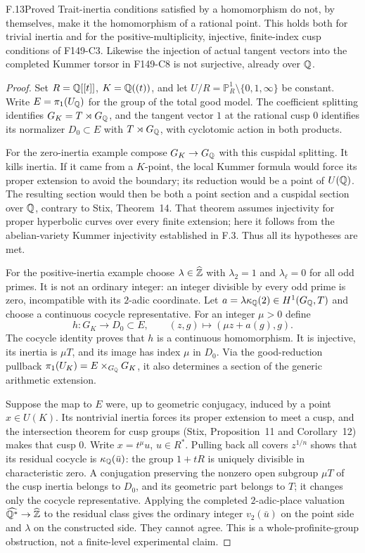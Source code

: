 \begin{claim}{F.13}{Proved}
Trait-inertia conditions satisfied by a homomorphism do not, by
themselves, make it the homomorphism of a rational point. This holds
both for trivial inertia and for the positive-multiplicity, injective,
finite-index cusp conditions of F149-C3. Likewise the injection of
actual tangent vectors into the completed Kummer torsor in F149-C8
is not surjective, already over $\mathbb Q$.
\end{claim}
\begin{proof}
Set $R=\mathbb Q[[t]]$, $K=\mathbb Q((t))$, and let
$U/R=\mathbb P^1_R\setminus\{0,1,\infty\}$ be constant. Write
$E=\pi_1(U_{\mathbb Q})$ for the group of the total good model. The
coefficient splitting identifies
$G_K=T\rtimes G_{\mathbb Q}$, and the tangent vector $1$ at the rational
cusp $0$ identifies its normalizer $D_0\subset E$ with
$T\rtimes G_{\mathbb Q}$, with cyclotomic action in both products.

For the zero-inertia example compose $G_K\to G_{\mathbb Q}$ with this
cuspidal splitting. It kills inertia. If it came from a $K$-point,
the local Kummer formula would force its proper extension to avoid
the boundary; its reduction would be a point of $U(\mathbb Q)$. The
resulting section would then be both a point section and a cuspidal
section over $\mathbb Q$, contrary to Stix, Theorem~14. That theorem
assumes injectivity for proper hyperbolic curves over every finite
extension; here it follows from the abelian-variety Kummer
injectivity established in F.3. Thus all its hypotheses are met.

For the positive-inertia example choose
$\lambda\in\widehat{\mathbb Z}$ with $\lambda_2=1$ and
$\lambda_\ell=0$ for all odd primes. It is not an ordinary integer:
an integer divisible by every odd prime is zero, incompatible with
its $2$-adic coordinate. Let
$a=\lambda\kappa_{\mathbb Q}(2)\in H^1(G_{\mathbb Q},T)$ and choose a
continuous cocycle representative. For an integer $\mu>0$ define
\[
h:G_K\longrightarrow D_0\subset E,
\qquad (z,g)\longmapsto(\mu z+a(g),g).
\]
The cocycle identity proves that $h$ is a continuous homomorphism.
It is injective, its inertia is $\mu T$, and its image has index
$\mu$ in $D_0$. Via the good-reduction pullback
$\pi_1(U_K)=E\times_{G_{\mathbb Q}}G_K$, it also determines a section
of the generic arithmetic extension.

Suppose the map to $E$ were, up to geometric conjugacy, induced
by a point $x\in U(K)$. Its nontrivial inertia forces its proper
extension to meet a cusp, and the intersection theorem for cusp
groups (Stix, Proposition~11 and Corollary~12) makes that cusp
$0$. Write $x=t^\mu u$, $u\in R^*$. Pulling back all covers
$z^{1/n}$ shows that its residual cocycle is
$\kappa_{\mathbb Q}(\bar u)$: the group $1+tR$ is uniquely divisible
in characteristic zero. A conjugation preserving the nonzero open
subgroup $\mu T$ of the cusp inertia belongs to $D_0$, and its
geometric part belongs to $T$; it changes only the cocycle
representative. Applying the completed $2$-adic-place valuation
$\widehat{\mathbb Q^*}\to\widehat{\mathbb Z}$ to the residual class gives the
ordinary integer $v_2(\bar u)$ on the point side and $\lambda$
on the constructed side. They cannot agree. This is a
whole-profinite-group obstruction, not a finite-level experimental
claim.


\end{proof}
